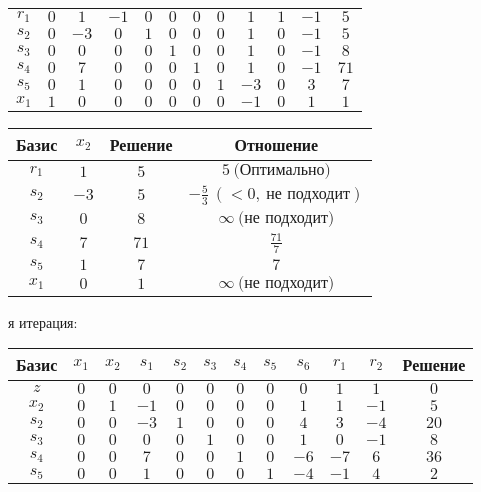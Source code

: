 \documentclass{article}%
\begin{document}
\begin{flushleft}
\begin{tabular}{|c|cccccccccc|c|}
\hline%
$r_{1}$&$0$&$1$&$-1$&$0$&$0$&$0$&$0$&$1$&$1$&$-1$&$5$\\%
$s_{2}$&$0$&$-3$&$0$&$1$&$0$&$0$&$0$&$1$&$0$&$-1$&$5$\\%
$s_{3}$&$0$&$0$&$0$&$0$&$1$&$0$&$0$&$1$&$0$&$-1$&$8$\\%
$s_{4}$&$0$&$7$&$0$&$0$&$0$&$1$&$0$&$1$&$0$&$-1$&$71$\\%
$s_{5}$&$0$&$1$&$0$&$0$&$0$&$0$&$1$&$-3$&$0$&$3$&$7$\\%
$x_{1}$&$1$&$0$&$0$&$0$&$0$&$0$&$0$&$-1$&$0$&$1$&$1$\\%
\hline%
\end{tabular}%
\newline%
\newline%
\newline%
\begin{tabular}{|cccc|}%
\hline%
Базис&$x_{2}$&Решение&Отношение\\%
\hline%
$r_{1}$&$1$&$5$&$5\: \text{(Оптимально)}$\\%
$s_{2}$&$-3$&$5$&$-\frac{5}{3}\: (< 0, \: \text{не подходит})$\\%
$s_{3}$&$0$&$8$&$\infty \: \text{(не подходит)}$\\%
$s_{4}$&$7$&$71$&$\frac{71}{7}$\\%
$s_{5}$&$1$&$7$&$7$\\%
$x_{1}$&$0$&$1$&$\infty \: \text{(не подходит)}$\\%
\hline%
\end{tabular}%
\newline%
\newline%
я итерация: %
\newline%
\newline%
\renewcommand{\arraystretch}{1.3}%
\begin{tabular}{|c|cccccccccc|c|}%
\hline%
Базис&$x_{1}$&$x_{2}$&$s_{1}$&$s_{2}$&$s_{3}$&$s_{4}$&$s_{5}$&$s_{6}$&$r_{1}$&$r_{2}$&Решение\\%
\hline%
$z$&$0$&$0$&$0$&$0$&$0$&$0$&$0$&$0$&$1$&$1$&$0$\\%
\hline%
$x_{2}$&$0$&$1$&$-1$&$0$&$0$&$0$&$0$&$1$&$1$&$-1$&$5$\\%
$s_{2}$&$0$&$0$&$-3$&$1$&$0$&$0$&$0$&$4$&$3$&$-4$&$20$\\%
$s_{3}$&$0$&$0$&$0$&$0$&$1$&$0$&$0$&$1$&$0$&$-1$&$8$\\%
$s_{4}$&$0$&$0$&$7$&$0$&$0$&$1$&$0$&$-6$&$-7$&$6$&$36$\\%
$s_{5}$&$0$&$0$&$1$&$0$&$0$&$0$&$1$&$-4$&$-1$&$4$&$2$\\%

\end{tabular}
\end{flushleft}
\end{document}
